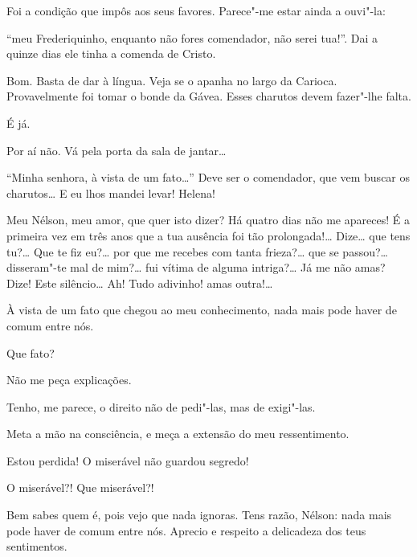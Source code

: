   Foi a condição que impôs aos seus favores. Parece"-me estar ainda
a ouvi"-la: {``meu Frederiquinho, enquanto não fores
comendador, não serei tua!''. Dai a quinze dias ele tinha a
comenda de Cristo.

  Bom. Basta de dar à língua. Veja se o apanha
no largo da Carioca. Provavelmente foi tomar o bonde da Gávea. Esses
charutos devem fazer"-lhe falta.

  É já. 

  Por aí não. Vá pela porta da sala de
jantar\ldots{} 


 
``Minha senhora, à vista de um fato\ldots{}''
 Deve ser o comendador, que vem buscar
os charutos\ldots{} E eu lhos mandei levar!  Helena!

  Meu Nélson, meu amor, que quer
isto dizer? Há quatro dias não me apareces! É a primeira vez em três
anos que a tua ausência foi tão prolongada!\ldots{} Dize\ldots{} que tens tu?\ldots{} 
Que te fiz eu?\ldots{} por que me recebes com tanta frieza?\ldots{} que se
passou?\ldots{} disseram"-te mal de mim?\ldots{} fui vítima de alguma intriga?\ldots{} 
Já me não amas? Dize!  Este silêncio\ldots{}  Ah! Tudo adivinho! amas outra!\ldots{}

  À
vista de um fato que chegou ao meu conhecimento, nada mais pode haver
de comum entre nós.

  Que fato?

  Não me peça explicações.

  Tenho, me parece, o direito não de pedi"-las,
mas de exigi"-las.

  Meta a mão na consciência, e meça a extensão
do meu ressentimento. 

  Estou perdida! O miserável não guardou
segredo! 

  O
miserável?! Que miserável?!

  Bem sabes quem é, pois vejo que nada
ignoras.  Tens razão, Nélson: nada mais pode
haver de comum entre nós. Aprecio e respeito a delicadeza dos teus
sentimentos. 

}
